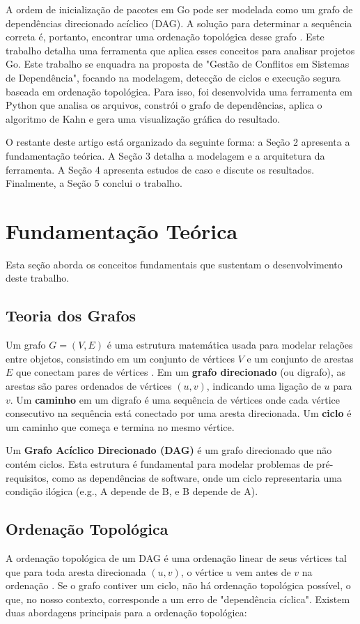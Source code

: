 \documentclass[12pt]{article}
\begin{document}
A ordem de inicialização de pacotes em Go pode ser modelada como um grafo de dependências direcionado acíclico (DAG). A solução para determinar a sequência correta é, portanto, encontrar uma ordenação topológica desse grafo \cite{clrs}. Este trabalho detalha uma ferramenta que aplica esses conceitos para analisar projetos Go. Este trabalho se enquadra na proposta de "Gestão de Conflitos em Sistemas de Dependência", focando na modelagem, detecção de ciclos e execução segura baseada em ordenação topológica. Para isso, foi desenvolvida uma ferramenta em Python que analisa os arquivos, constrói o grafo de dependências, aplica o algoritmo de Kahn e gera uma visualização gráfica do resultado.

O restante deste artigo está organizado da seguinte forma: a Seção 2 apresenta a fundamentação teórica. A Seção 3 detalha a modelagem e a arquitetura da ferramenta. A Seção 4 apresenta estudos de caso e discute os resultados. Finalmente, a Seção 5 conclui o trabalho.

\section{Fundamentação Teórica}
Esta seção aborda os conceitos fundamentais que sustentam o desenvolvimento deste trabalho.

\subsection{Teoria dos Grafos}
Um grafo $G = (V, E)$ é uma estrutura matemática usada para modelar relações entre objetos, consistindo em um conjunto de vértices $V$ e um conjunto de arestas $E$ que conectam pares de vértices \cite{clrs}. Em um \textbf{grafo direcionado} (ou digrafo), as arestas são pares ordenados de vértices $(u, v)$, indicando uma ligação de $u$ para $v$. Um \textbf{caminho} em um digrafo é uma sequência de vértices onde cada vértice consecutivo na sequência está conectado por uma aresta direcionada. Um \textbf{ciclo} é um caminho que começa e termina no mesmo vértice.

Um \textbf{Grafo Acíclico Direcionado (DAG)} é um grafo direcionado que não contém ciclos. Esta estrutura é fundamental para modelar problemas de pré-requisitos, como as dependências de software, onde um ciclo representaria uma condição ilógica (e.g., A depende de B, e B depende de A).

\subsection{Ordenação Topológica}
A ordenação topológica de um DAG é uma ordenação linear de seus vértices tal que para toda aresta direcionada $(u, v)$, o vértice $u$ vem antes de $v$ na ordenação \cite{clrs}. Se o grafo contiver um ciclo, não há ordenação topológica possível, o que, no nosso contexto, corresponde a um erro de "dependência cíclica". Existem duas abordagens principais para a ordenação topológica:
\end{document}
